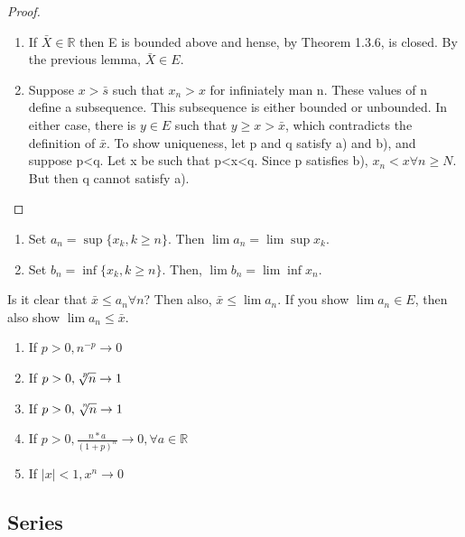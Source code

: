 \documentclass[11pt,fleqn]{book} %
\begin{document}
\begin{proof}
	\begin{enumerate} [label = \alph*)]
		\item If $\bar{X} \in \mathbb{R}$ then E is bounded above and hense, by Theorem 1.3.6, is closed. By the previous lemma, $\bar{X} \in E.$
		\item Suppose $x>\bar{s}$ such that $x_n > x$ for infiniately man n. These values of n define a subsequence. This subsequence is either bounded or unbounded. In either case, there is $y \in E$ such that $y \ge x > \bar{x}$, which contradicts the definition of $\bar{x}$.
		To show uniqueness, let p and q satisfy a) and b), and suppose p<q. Let x be such that p<x<q. Since p satisfies b), $x_n < x \forall n \ge N$. But then q cannot satisfy a).
	\end{enumerate}
\end{proof}

\begin{theorem}
	\begin{enumerate}[label = \alph*)]
		\item Set $a_n = \sup\{x_k, k \ge n\}$. Then $\lim a_n = \lim\sup x_k$.
		\item Set $b_n = \inf\{x_k, k\ge n\}$. Then, $\lim b_n = \lim\inf x_n$.
	\end{enumerate}
	Is it clear that $\bar{x} \le a_n \forall n$? Then also, $\bar{x} \le \lim a_n$. If you show $\lim a_n \in E$, then also show $\lim a_n \le \bar{x}$.
\end{theorem}

\begin{theorem}
	\begin{enumerate}[label = \alph*)]
		\item If $p > 0, n^{-p} \rightarrow 0$
		\item If $p > 0, \sqrt[\leftroot{-3}\uproot{3}p]{n} \rightarrow 1$
		\item If $p>0, \sqrt[\leftroot{-3}\uproot{3}n]{n} \rightarrow 1$
		\item If $p >0, \frac{n*a}{(1+p)^n} \rightarrow 0, \forall a \in \mathbb{R} $
		\item If $|x| < 1, x^n \rightarrow 0$
	\end{enumerate}
\end{theorem}

\subsection{Series}
\end{document}
